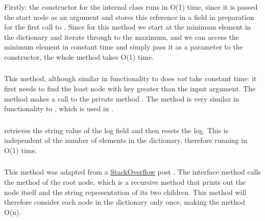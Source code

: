 \subsubsection{}

\subsubsection{}
Firstly: the constructor for the internal class  runs in O(1) time, since it is passed the start node as an argument and stores this reference in a field in preparation for the first call to . Since for this method we start at the minimum element in the dictionary and iterate through to the maximum, and we can access the minimum element in constant time and simply pass it as a parameter to the  constructor, the whole method takes O(1) time.

\subsubsection{}
This method, although similar in functionality to  does \textit{not} take constant time: it first needs to find the least node with key greater than the input argument. The method makes a call to the private method . The method  is very similar in functionality to , which is used in .

\subsubsection{}
 retrieves the string value of the  log field and then resets the log. This is independent of the number of elements in the dictionary, therefore running in O(1) time.

\subsubsection{}
This method was adapted from a \href{http://stackoverflow.com/}{StackOverflow} post \parencite{stackoverflow}. The interface method  calls the  method of the root node, which is a recursive method that prints out the node itself and the string representation of its two children. This method will therefore consider each node in the dictionary only once, making the method O(n).

